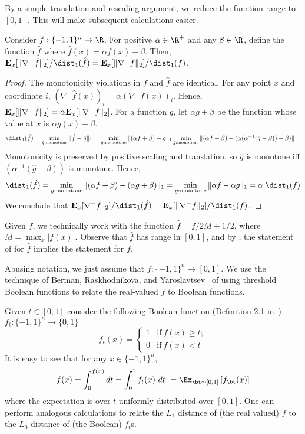 By a simple translation and rescaling argument, we reduce the function range to $[0,1]$.
This will make subsequent calculations easier.

\begin{claim} \label{clm:rescale} Consider $f:\{-1,1\}^n \to \R$. For positive $\alpha \in \R^+$ and
any $\beta \in \R$, define the function $\hat{f}$ where $\hat{f}(x) = \alpha f(x) + \beta$. Then,
$\EX_x[\|\nabla^- \hat{f}\|_2]/\dist_1(\hat{f}) =\EX_x[\|\nabla^- f\|_2]/\dist_1(f) $.
\end{claim}

\begin{proof} The monotonicity violations in $f$ and $\hat{f}$ are identical.
For any point $x$ and coordinate $i$, $ (\nabla^- \hat{f}(x))_i = \alpha (\nabla^- f(x))_i$.
Hence, $\hbox{\bf E}_x[\|\nabla^- \hat{f}\|_2] = \alpha \hbox{\bf E}_x[\|\nabla^- f\|_2]$.
For a function $g$, let $\alpha g + \beta$ be the function whose value at $x$
is $\alpha g(x) + \beta$.
\begin{align*}
 \dist_1(\hat{f}) = \min_{\hat{g}: \textrm{monotone}} \|\hat{f}-\hat{g}\|_1 &= \min_{\hat{g}: \textrm{monotone}} \| (\alpha f + \beta) - \hat{g}\|_1
\min_{\hat{g}: \textrm{monotone}} \|(\alpha f + \beta) - (\alpha (\alpha^{-1}(\hat{g} - \beta)) + \beta)\|
\end{align*}
Monotonicity is preserved by positive scaling and translation, so $\hat{g}$ is monotone iff $(\alpha^{-1}(\hat{g} - \beta))$
is monotone.
Hence,
\begin{align*}
 \dist_1(\hat{f}) = \min_{g: \textrm{monotone}} \|(\alpha f + \beta) - (\alpha g + \beta)\|_1
= \min_{g: \textrm{monotone}} \|\alpha f - \alpha g\|_1 = \alpha \ \dist_1(f)
\end{align*}
We conclude that  
$\EX_x[\nabla^- \hat{f}\|_2]/\dist_1(\hat{f}) =\EX_x[\|\nabla^- f\|_2]/\dist_1(f) $.
\end{proof}

Given $f$, we technically work with the function $\hat{f} = f/2M + 1/2$,
where $M = \max_x |f(x)|$. Observe that $\hat{f}$ has range in $[0,1]$,
and by , the statement of  for $\hat{f}$ implies
the statement for $f$.

Abusing notation, we just assume that $f:\{-1,1\}^n \to [0,1]$.
We use the technique of Berman, Raskhodnikova, and Yaroslavtsev~\cite{BeRaYa14} of using threshold Boolean functions to relate the real-valued $f$ to Boolean functions. 

\noindent
Given $t\in [0,1]$ consider the following Boolean function (Definition 2.1 in~\cite{BeRaYa14}) $f_t : \{-1,1\}^n \to \{0,1\}$
\[
	f_t(x) = \begin{cases}
		1 & \text{if}~ f(x) \geq t; \\
		0 & \text{if}~ f(x) < t
	\end{cases}
\]
\noindent
It is easy to see that for any $x\in \{-1,1\}^n$,
\[
	f(x) = \int_0^{f(x)} dt  =  \int_0^1 f_t(x)~dt ~= \Ex_{\bt \sim [0,1]} \left[ f_{\bt}(x) \right]
\]
where the expectation is over $t$ uniformly distributed over $[0,1]$.
One can perform analogous calculations to relate the $L_1$ distance of (the real valued)
$f$ to the $L_0$ distance of (the Boolean) $f_t$s.  

